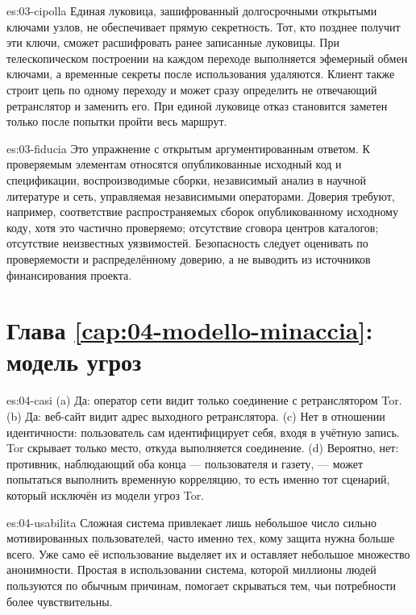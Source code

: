 \begin{soluzione}{es:03-cipolla}
Единая луковица, зашифрованный долгосрочными открытыми ключами узлов, не обеспечивает прямую секретность. Тот, кто позднее получит эти ключи, сможет расшифровать ранее записанные луковицы. При телескопическом построении на каждом переходе выполняется эфемерный обмен ключами, а временные секреты после использования удаляются. Клиент также строит цепь по одному переходу и может сразу определить не отвечающий ретранслятор и заменить его. При единой луковице отказ становится заметен только после попытки пройти весь маршрут.
\end{soluzione}

\begin{soluzione}{es:03-fiducia}
Это упражнение с открытым аргументированным ответом. К проверяемым элементам относятся опубликованные исходный код и спецификации, воспроизводимые сборки, независимый анализ в научной литературе и сеть, управляемая независимыми операторами. Доверия требуют, например, соответствие распространяемых сборок опубликованному исходному коду, хотя это частично проверяемо; отсутствие сговора центров каталогов; отсутствие неизвестных уязвимостей. Безопасность следует оценивать по проверяемости и распределённому доверию, а не выводить из источников финансирования проекта.
\end{soluzione}

\section*{Глава \ref{cap:04-modello-minaccia}: модель угроз}

\begin{soluzione}{es:04-casi}
(a) Да: оператор сети видит только соединение с ретранслятором Tor. (b) Да: веб-сайт видит адрес выходного ретранслятора. (c) Нет в отношении идентичности: пользователь сам идентифицирует себя, входя в учётную запись. Tor скрывает только место, откуда выполняется соединение. (d) Вероятно, нет: противник, наблюдающий оба конца — пользователя и газету, — может попытаться выполнить временную корреляцию, то есть именно тот сценарий, который исключён из модели угроз Tor.
\end{soluzione}

\begin{soluzione}{es:04-usabilita}
Сложная система привлекает лишь небольшое число сильно мотивированных пользователей, часто именно тех, кому защита нужна больше всего. Уже само её использование выделяет их и оставляет небольшое множество анонимности. Простая в использовании система, которой миллионы людей пользуются по обычным причинам, помогает скрываться тем, чьи потребности более чувствительны.
\end{soluzione}

